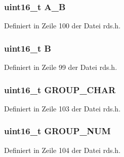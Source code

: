 \subsubsection[{A\+\_\+\+B}]{\setlength{\rightskip}{0pt plus 5cm}uint16\+\_\+t A\+\_\+\+B}\label{structgroup__2b_a226eb9a4ec1152d0c92ce7324916ad56}


Definiert in Zeile 100 der Datei rds.\+h.

\hypertarget{structgroup__2b_ae783bd90764c8455228772c025c064e4}{}
\subsubsection[{B}]{\setlength{\rightskip}{0pt plus 5cm}uint16\+\_\+t B}\label{structgroup__2b_ae783bd90764c8455228772c025c064e4}


Definiert in Zeile 99 der Datei rds.\+h.

\hypertarget{structgroup__2b_a66d4119990dc4c3e040a43885e9bb953}{}
\subsubsection[{G\+R\+O\+U\+P\+\_\+\+C\+H\+A\+R}]{\setlength{\rightskip}{0pt plus 5cm}uint16\+\_\+t G\+R\+O\+U\+P\+\_\+\+C\+H\+A\+R}\label{structgroup__2b_a66d4119990dc4c3e040a43885e9bb953}


Definiert in Zeile 103 der Datei rds.\+h.

\hypertarget{structgroup__2b_a9f692e9f76ee88348d426bcd4e9bc70b}{}
\subsubsection[{G\+R\+O\+U\+P\+\_\+\+N\+U\+M}]{\setlength{\rightskip}{0pt plus 5cm}uint16\+\_\+t G\+R\+O\+U\+P\+\_\+\+N\+U\+M}\label{structgroup__2b_a9f692e9f76ee88348d426bcd4e9bc70b}


Definiert in Zeile 104 der Datei rds.\+h.

\hypertarget{structgroup__2b_a5cd9b1f6413028425796c1129aa8fd87}{}
